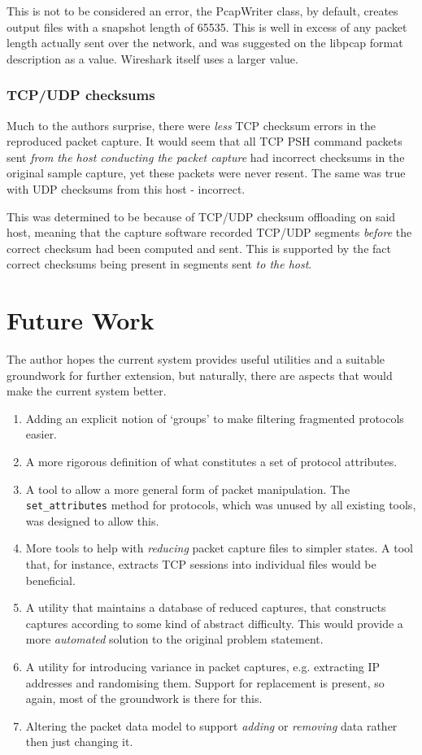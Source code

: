 \documentclass[10pt,a4paper,notitlepage]{report}
\begin{document}
This is not to be considered an error, the PcapWriter class, by default, creates output files with a snapshot length of 65535. This is well in excess of any packet length actually sent over the network, and was suggested on the libpcap format description as a value. Wireshark itself uses a larger value.

\subsection{TCP/UDP checksums}
\label{sec:tcpchksum}
Much to the authors surprise, there were \emph{less} TCP checksum errors in the reproduced packet capture.
It would seem that all TCP PSH command packets sent \emph{from the host conducting the packet capture} had incorrect checksums in the original sample capture, yet these packets were never resent. The same was true with UDP checksums from this host - incorrect.

This was determined to be because of TCP/UDP checksum offloading on said host, meaning that the capture software recorded TCP/UDP segments \emph{before} the correct checksum had been computed and sent. This is supported by the fact correct checksums being present in segments sent \emph{to the host}.

\chapter{Future Work}
The author hopes the current system provides useful utilities and a suitable groundwork for further extension, but naturally, there are aspects that would make the current system better.
\begin{enumerate}[label=\roman*)]
\item Adding an explicit notion of `groups' to make filtering fragmented protocols easier.
\item A more rigorous definition of what constitutes a set of protocol attributes.
\item A tool to allow a more general form of packet manipulation. The \texttt{set_attributes} method for protocols, which was unused by all existing tools, was designed to allow this.
\item More tools to help with \emph{reducing} packet capture files to simpler states. A tool that, for instance, extracts TCP sessions into individual files would be beneficial.
\item A utility that maintains a database of reduced captures, that constructs captures according to some kind of abstract difficulty. This would provide a more \emph{automated} solution to the original problem statement.
\item A utility for introducing variance in packet captures, e.g. extracting IP addresses and randomising them. Support for replacement is present, so again, most of the groundwork is there for this.
\item Altering the packet data model to support \emph{adding} or \emph{removing} data rather then just changing it.
\end{enumerate}
\end{document}
